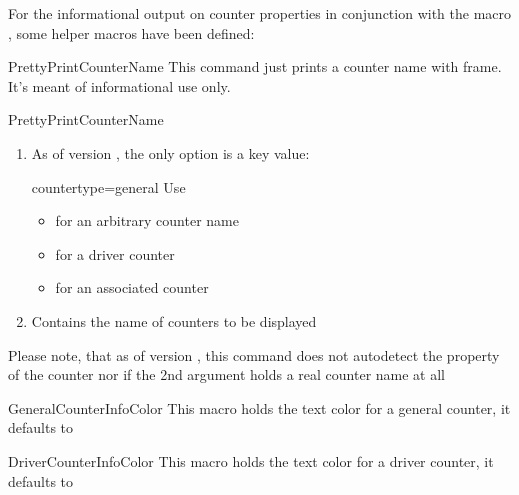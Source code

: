 \documentclass[12pt,paper=a4]{article}
\def\packageversion{\assoccntpackageversion}%
\begin{document}
For the informational output on counter properties in conjunction with the macro
 , some helper macros have been defined:

\begin{docCommand}{PrettyPrintCounterName}{}
This command just prints a counter name with frame. It's meant of informational use only.
\begin{docCommandArgs}{PrettyPrintCounterName}
\begin{enumerate}[label={\textcolor{blue}{\#\arabic*}}]
\item {}%

  As of version \packageversion, the only option is a key value:
  \begin{docKey}{countertype}{=}{general}
    Use
    \begin{itemize}
    \item {} for an arbitrary counter name
    \item {} for a driver counter
    \item {} for an associated counter
    \end{itemize}
  \end{docKey}

\item {}
  Contains the name of counters to be displayed

\end{enumerate}
\end{docCommandArgs}%

Please note, that as of version \packageversion, this command does not autodetect the property of the counter nor if the 2nd argument holds a real counter name at all 
\end{docCommand}%

\begin{docCommand}{GeneralCounterInfoColor}{}
This macro holds the text color for a general counter, it defaults to \meta{\textcolor{\GeneralCounterInfoColor}{\expandafter{\GeneralCounterInfoColor}}}%
\end{docCommand}


\begin{docCommand}{DriverCounterInfoColor}{}
This macro holds the text color for a driver counter, it defaults to \meta{\textcolor{\DriverCounterInfoColor}{\expandafter{\DriverCounterInfoColor}}}%
\end{docCommand}
\end{document}
